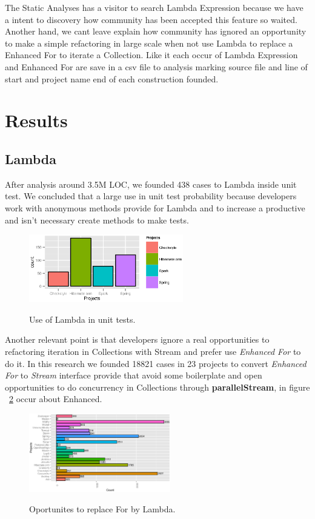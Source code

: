\documentclass{sig-alternate-05-2015}
\begin{document}
The Static Analyses has a visitor to search  Lambda Expression because we have a intent to discovery how community has been accepted this feature so waited. Another hand, we cant leave explain how community has ignored an opportunity to make a simple refactoring in large scale when not use Lambda to replace a Enhanced For to iterate a Collection. Like it each occur of Lambda Expression and Enhanced For are save in a csv file to analysis marking source file and line of start and project name end of each construction founded.\\
  

\section{Results}

\subsection{Lambda}
After analysis around 3.5M LOC, we founded 438 cases to Lambda inside unit test. We concluded that a large use in unit test probability because developers work with anonymous methods provide for Lambda and to increase a productive and isn't necessary create methods to make tests.\\

\begin{figure}[h]
	\center
	\includegraphics[width=0.60\textwidth]{lambdaTest}
	\label{fig:testsLambda}
	\caption{Use of Lambda in unit tests.}
\end{figure}

Another relevant point is that developers ignore a real opportunities to refactoring iteration in Collections with Stream and prefer use \textit{Enhanced For} to do it. In this research we founded 18821 cases in 23 projects to convert \textit{Enhanced For} to \textit{Stream} interface provide that avoid some boilerplate and open opportunities to do concurrency in Collections through \textbf{parallelStream}, in figure ~\ref{fig:opportunitiesLambda} occur about Enhanced.\\

\begin{figure}[h]
	\center
	\includegraphics[width=0.55\textwidth]{lamdaOpport}
	\label{fig:opportunitiesLambda}
	\caption{Oportunites to replace For by Lambda.}
\end{figure}
\end{document}
